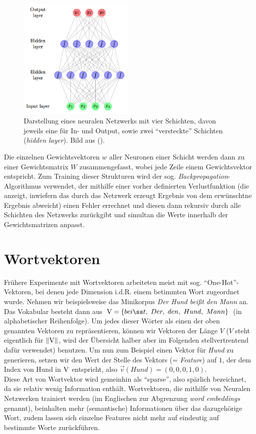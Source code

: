 \begin{figure}[h]
  \centering
  \includegraphics[width=0.5\textwidth]{../img/neuralnet.png}
  \caption[Darstellung eine neuralen Netzwerks]{Darstellung eines neuralen Netzwerks mit vier Schichten, davon jeweils eine
  für In- und Output, sowie zwei ``versteckte'' Schichten (\emph{hidden layer}). Bild aus (\cite{Goldberg15c}).}
\end{figure}

Die einzelnen Gewichtsvektoren $w$ aller Neuronen einer Schicht werden dann zu einer Gewichtsmatrix $W$ zusammengefasst,
wobei jede Zeile einem Gewichtsvektor entspricht. Zum Training dieser Strukturen wird der sog. \emph{Backpropagation}-
Algorithmus verwendet, der mithilfe einer vorher definierten Verlustfunktion (die anzeigt, inwiefern das durch das Netzwerk
erzeugt Ergebnis von dem erwünschtne Ergebnis abweicht) einen Fehler errechnet und diesen dann rekursiv durch alle
Schichten des Netzwerks zurückgibt und simultan die Werte innerhalb der Gewichtsmatrizen anpasst.

\section{Wortvektoren}

Frühere Experimente mit Wortvektoren arbeiteten meist mit sog. ``One-Hot''-Vektoren, bei denen jede Dimension i.d.R.
einem betimmten Wort zugeordnet wurde. Nehmen wir beispielsweise das Minikorpus \emph{Der Hund beißt den Mann} an.
Das Vokabular besteht dann aus $\textsc{V} = \{bei{\ss}t,\ Der,\ den,\ Hund,\ Mann\}$ (in alphabetischer Reihenfolge).
Um jedes dieser Wörter als einen der oben genannten Vektoren zu repräsentieren, können wir Vektoren der Länge $V$
($V$ steht eigentlich für $\|\textsc{V}\|$, wird der Übersicht halber aber im Folgenden stellvertrentend dafür verwendet)
benutzen. Um nun zum Beispiel einen Vektor für \emph{Hund} zu generieren, setzen wir den Wert der Stelle des Vektors (=
\emph{Feature}) auf $1$, der dem Index von Hund in $\textsc{V}$ entspricht,
also $\vec{v}(Hund)=(0, 0, 0, 1, 0)$.\\
Diese Art von Wortvektor wird gemeinhin als ``sparse'', also spärlich bezeichnet, da sie relativ wenig Information enthält.
Wortvektoren, die mithilfe von Neuralen Netzwerken trainiert werden (im Englischen zur Abgrenzung \emph{word embeddings}
genannt), beinhalten mehr (semantische) Informationen über das dazugehörige Wort, zudem lassen sich einzelne Features
nicht mehr auf eindeutig auf bestimmte Worte zurückführen.\\


